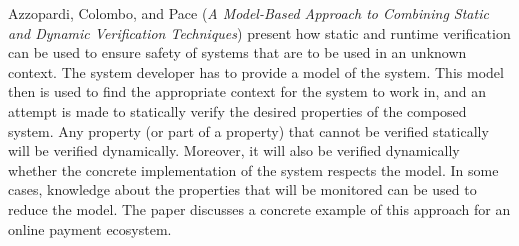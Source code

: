 

Azzopardi, Colombo, and Pace \cite{isola-2016-azzopardi} ({\em A
Model-Based Approach to Combining Static and Dynamic Verification
Techniques}) present how static and runtime verification can be used to
ensure safety of systems that are to be used in an unknown
context. The system developer has to provide a model of the
system. This model then is used to find the appropriate context for the
system to work in, and an attempt is made to statically verify the
desired properties of the composed system. Any property (or part of a property)
that cannot be verified statically will be verified
dynamically. Moreover, it will also be verified dynamically whether
the concrete implementation of the system respects the
model. In some cases, knowledge about the properties that
will be monitored can be used to reduce the model. The paper discusses
a concrete example of this approach for an online payment ecosystem.
